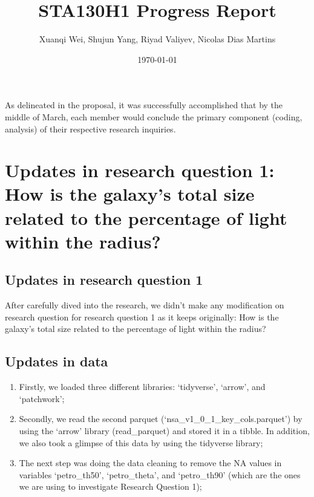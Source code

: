 \documentclass[12pt]{article}
\title{STA130H1 Progress Report}
\author{Xuanqi Wei, Shujun Yang, Riyad Valiyev, Nicolas Dias Martins}
\date{\today}
\begin{document}
\maketitle
\thispagestyle{empty}

As delineated in the proposal, it was successfully accomplished that by the middle of March, each member would conclude the primary component (coding, analysis) of their respective research inquiries.

\newpage

\tableofcontents
\thispagestyle{empty}

\newpage

\setcounter{page}{1}

\section{Updates in research question 1: How is the galaxy's total size related to the percentage of light within the radius?}

\subsection{Updates in research question 1}
After carefully dived into the research, we didn't make any modification on research question for research question 1 as it keeps originally: How is the galaxy's total size related to the percentage of light within the radius?

\subsection{Updates in data}
\begin{enumerate}
	\item Firstly, we loaded three different libraries: `tidyverse', `arrow', and `patchwork';
	\item Secondly, we read the second parquet (`nsa\_v1\_0\_1\_key\_cols.parquet') by using the `arrow' library (read\_parquet) and stored it in a tibble. In addition, we also took a glimpse of this data by using the tidyverse library;
	\item The next step was doing the data cleaning to remove the NA values in variables `petro\_th50', `petro\_theta', and `petro\_th90' (which are the ones we are using to investigate Research Question 1);
\end{enumerate}
\end{document}
